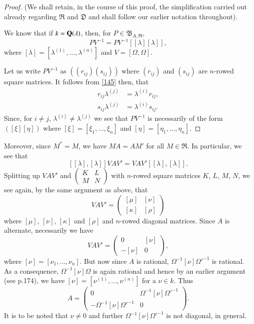 \begin{proof}
(We shall retain, in the course of this proof, the simplification
  carried out already regarding $\mathfrak{R}$ and $\mathfrak{D}$ and
  shall follow our earlier notation throughout).

We know that if $k=\mathbf{Q}(\lambda)$, then, for
$P\in\mathfrak{B}_{A,\mathfrak{R}}$,
\begin{equation*}
[\lambda]PV^{-1}=PV^{-1}[[\lambda][\lambda]],\tag{145}\label{145}
\end{equation*}
where $[\lambda]=[\lambda^{(1)},\ldots,\lambda^{(n)}]$ and
$V=[\Omega,\Omega]$.

Let us write $PV^{-1}$ as $((r_{ij})(s_{ij}))$ where $(r_{ij})$ and
$(s_{ij})$ are $n$-rowed square matrices. It follows from \eqref{145}
then, that
\begin{align*}
r_{ij}\lambda^{(j)} &= \lambda^{(i)}r_{ij},\\
s_{ij}\lambda^{(j)} &= \lambda^{(i)}s_{ij}.
\end{align*}
Since, for $i\neq j$, $\lambda^{(i)}\neq \lambda^{(j)}$ we see that
$PV^{-1}$ is necessarily of the form $([\xi][\eta])$ where
$[\xi]=[\xi_{1},\ldots,\xi_{n}]$ and
$[\eta]=[\eta_{1},\ldots,\eta_{n}]$.
\end{proof}

Moreover, since $M^{\ast}=M$, we have $MA=AM'$ for all
$M\in\mathfrak{R}$. In particular, we see that 
$$
[[\lambda],[\lambda]]VAV'=VAV'[[\lambda],[\lambda]].
$$\pageoriginale
Splitting up $VAV'$ and $\left(\begin{smallmatrix} K & L\\ M & N
\end{smallmatrix}\right)$ with $n$-rowed square matrices $K$, $L$,
$M$, $N$, we see again, by the same argument as above, that
$$
VAV'=
\begin{pmatrix}
[\mu] & [\nu]\\
[\kappa] & [\rho]
\end{pmatrix}
$$
where $[\mu]$, $[\nu]$, $[\kappa]$ and $[\rho]$ and $n$-rowed diagonal
matrices. Since $A$ is alternate, necessarily we have
$$
VAV'=
\begin{pmatrix}
0 & [\nu]\\
-[\nu] & 0
\end{pmatrix},
$$
where $[\nu]=[\nu_{1},\ldots,\nu_{n}]$. But now since $A$ is rational,
$\Omega^{-1}[\nu]{\Omega'}^{-1}$ is rational. As a consequence,
$\Omega^{-1}[\nu]\Omega$ is again rational and hence by an earlier
argument (see p.\@ 174), we have $[\nu]=[\nu^{(1)},\ldots,\nu^{(n)}]$
for a $\nu\in k$. Thus
$$
A=
\begin{pmatrix}
0 & \Omega^{-1}[\nu]{\Omega'}^{-1}\\
-\Omega^{-1}[\nu]{\Omega'}^{-1} & 0
\end{pmatrix}.
$$
It is to be noted that $\nu\neq 0$ and further
$\Omega^{-1}[\nu]{\Omega'}^{-1}$ is not diagonal, in general.

